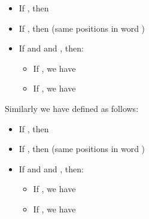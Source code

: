 \begin{itemize}
\item If , then 
\item If , then  (same positions in word )
\item If  and  and , then:
\begin{itemize}
\item  If , we have 
\item  If , we have 
\end{itemize}
\end{itemize}
Similarly we have  defined as follows:
\begin{itemize}
\item If , then 
\item If , then  (same positions in word )
\item If  and  and , then:
\begin{itemize}
\item  If , we have 
\item  If , we have 
\end{itemize}
\end{itemize}


